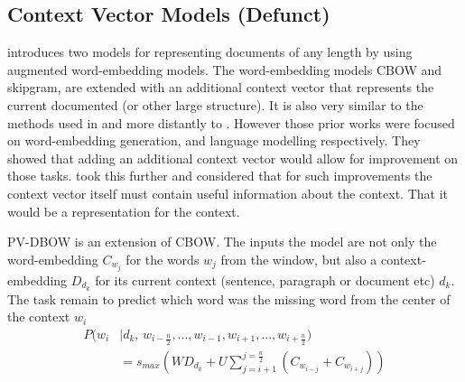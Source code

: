 \documentclass[12pt,parskip]{komatufte}
\begin{document}
\subsection{Context Vector Models (Defunct)}


 introduces two models for representing documents of any length by using augmented word-embedding models.
The word-embedding models CBOW and skipgram, are extended with an additional context vector that represents the current documented (or other large structure).
It is also very similar to the methods used in  and more distantly to .
However those prior works were focused on word-embedding generation, and language modelling respectively.
They showed that adding an additional context vector would allow for improvement on those tasks.
\textcite{le2014distributed} took this further and considered that for such improvements the context vector itself must contain useful information about the context.
That it would be a representation for the context.


PV-DBOW is an extension of CBOW.
The inputs the model are not only the word-embedding $C_{w_j}$ for the words $w_j$ from the window,
but also a context-embedding $D_{d_k}$ for its current context (sentence, paragraph or document etc) $d_k$.
The task remain to predict which word was the missing word from the center of the context $w_i$
\begin{align}
P(w_i & \mid d_k,\, w_{i-\frac{n}{2}},..., w_{i-1}, w_{i+1},...,w_{i+\frac{n}{2}})  \nonumber
\\  & = s_{max}(WD_{d_k} + U \sum_{j=i+1}^{j=\frac{n}{2}} \left( C_{w_{i-j}}+C_{w_{i+j}} \right))
\end{align}

\end{document}
